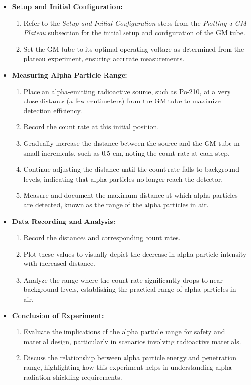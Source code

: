 \documentclass[11pt]{article}
\begin{document}
	\begin{itemize}
		\item \textbf{Setup and Initial Configuration:}
		\begin{enumerate}
			\item Refer to the \textit{Setup and Initial Configuration} steps from the \textit{Plotting a GM Plateau} subsection for the initial setup and configuration of the GM tube.
			\item Set the GM tube to its optimal operating voltage as determined from the plateau experiment, ensuring accurate measurements.
		\end{enumerate}
		
		\item \textbf{Measuring Alpha Particle Range:}
		\begin{enumerate}
			\item Place an alpha-emitting radioactive source, such as Po-210, at a very close distance (a few centimeters) from the GM tube to maximize detection efficiency.
			\item Record the count rate at this initial position.
			\item Gradually increase the distance between the source and the GM tube in small increments, such as 0.5 cm, noting the count rate at each step.
			\item Continue adjusting the distance until the count rate falls to background levels, indicating that alpha particles no longer reach the detector.
			\item Measure and document the maximum distance at which alpha particles are detected, known as the range of the alpha particles in air.
		\end{enumerate}
		
		\item \textbf{Data Recording and Analysis:}
		\begin{enumerate}
			\item Record the distances and corresponding count rates.
			\item Plot these values to visually depict the decrease in alpha particle intensity with increased distance.
			\item Analyze the range where the count rate significantly drops to near-background levels, establishing the practical range of alpha particles in air.
		\end{enumerate}
		
		\item \textbf{Conclusion of Experiment:}
		\begin{enumerate}
			\item Evaluate the implications of the alpha particle range for safety and material design, particularly in scenarios involving radioactive materials.
			\item Discuss the relationship between alpha particle energy and penetration range, highlighting how this experiment helps in understanding alpha radiation shielding requirements.
		\end{enumerate}
	\end{itemize}
	
\end{document}

